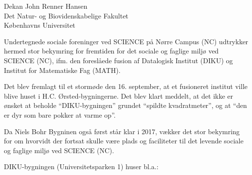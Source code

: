 \documentclass[a4paper]{article}
\begin{document}

Dekan John Renner Hansen \\
Det Natur- og Biovidenskabelige Fakultet \\
Københavns Universitet

\vspace{25pt}

Undertegnede sociale foreninger ved SCIENCE på Nørre Campus (NC) udtrykker
hermed stor bekymring for fremtiden for det sociale og faglige miljø ved
SCIENCE (NC), ifm. den foreslåede fusion af Datalogisk Institut (DIKU) og
Institut for Matematiske Fag (MATH).

Det blev fremlagt til et stormøde den 16. september, at et fusioneret institut
ville blive huset i H.C. Ørsted-bygningerne. Det blev klart meddelt, at det
ikke er ønsket at beholde ``DIKU-bygningen'' grundet ``spildte kvadratmeter'',
og at ``den er dyr som bare pokker at varme op''.

Da Niels Bohr Bygninen også først står klar i 2017, vækker det stor
bekymring for om hvorvidt der fortsat skulle være plads og faciliteter
til det levende sociale og faglige miljø ved SCIENCE (NC).

DIKU-bygningen (Universitetsparken 1) huser bl.a.:
\end{document}
